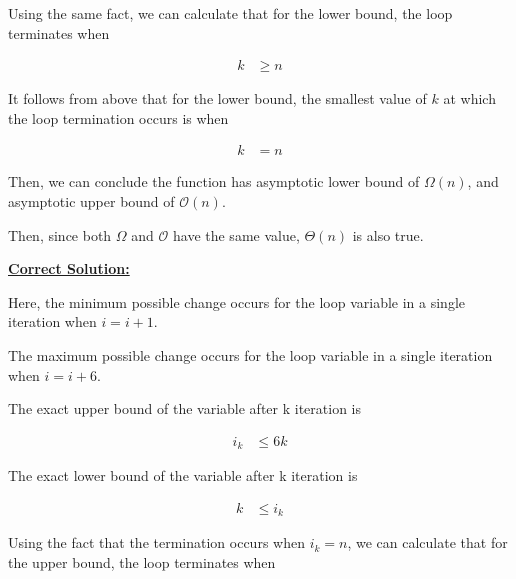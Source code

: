 \documentclass[12pt]{article}
\begin{document}
\begin{enumerate}[a.]
    Using the same fact, we can calculate that for the lower bound, the loop
    terminates when

    \begin{align}
        k &\geq n
    \end{align}

    It follows from above that for the lower bound, the smallest value of $k$ at which
    the loop termination occurs is when

    \begin{align}
        k &= n
    \end{align}

    \bigskip

    Then, we can conclude the function has asymptotic lower bound of $\Omega(n)$, and
    asymptotic upper bound of $\mathcal{O}(n)$.

    \bigskip

    Then, since both $\Omega$ and $\mathcal{O}$ have the same value, $\Theta(n)$
    is also true.

    \bigskip

    \begin{mdframed}
        \underline{\textbf{Correct Solution:}}

        \bigskip

        Here, the minimum possible change occurs for the loop variable in a single
        iteration when $i = i + 1$.

        \bigskip

        The maximum possible change occurs for the loop variable in a single
        iteration when $i = i + 6$.

        \bigskip

        The exact upper bound of the variable after k iteration is

        \begin{align}
            i_k &\leq 6k
        \end{align}

        \bigskip

        The exact lower bound of the variable after k iteration is

        \begin{align}
            k &\leq i_k
        \end{align}

        \bigskip

        Using the fact that the termination occurs when $i_k = n$, we can calculate
        that for the upper bound, the loop terminates when


\end{mdframed}
\end{enumerate}
\end{document}
